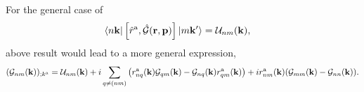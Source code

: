 For the general
case of
\begin{align}\label{a.8}
\langle n\mathbf{k} |
\left[\hat r^{\mathrm{a}},\hat{{\mathbf{\cal G}}}(\mathbf{r},\mathbf{p})\right]
| m\mathbf{k}' \rangle
&=
{\cal U}_{nm}(\mathbf{k})
,
\end{align}
above result would lead to a more general expression, 
\begin{align}\label{a.9}
({\mathbf{\cal G}}_{nm}(\mathbf{k}))_{;k^{\mathrm{a}}}
&=
{\cal U}_{nm}(\mathbf{k})
+
i\sum_{q\ne(nm)}
\left(
r_{nq}^{\mathrm{a}} (\mathbf{k})
{\mathbf{\cal G}}_{qm}(\mathbf{k})
-
{\mathbf{\cal G}}_{nq}(\mathbf{k})
r_{qm}^{\mathrm{a}} (\mathbf{k})
\right)
+ir_{nm}^{\mathrm{a}} (\mathbf{k}) ({\mathbf{\cal G}}_{mm}(\mathbf{k})-{\mathbf{\cal G}}_{nn}(\mathbf{k}))
.
\nonumber\\
\end{align}
